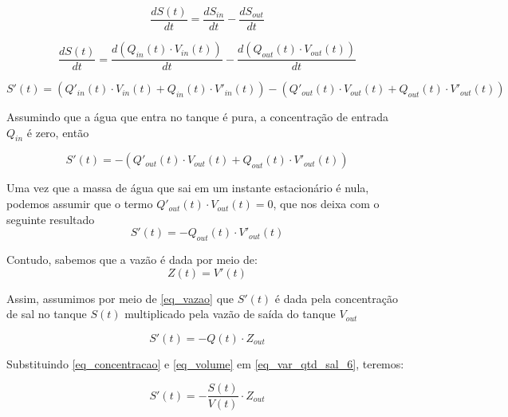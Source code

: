 \documentclass[11pt]{article}
\begin{document}
\begin{equation*}
    \label{eq_var_qtd_sal_2}
    \frac{dS(t)}{dt} = \frac{dS_{in}}{dt} - \frac{dS_{out}}{dt}
\end{equation*}

\begin{equation*}
    \label{eq_var_qtd_sal_3}
    \frac{dS(t)}{dt} = \frac{d(Q_{in}(t) \cdot V_{in}(t))}{dt} - \frac{d(Q_{out}(t) \cdot V_{out}(t))}{dt}
\end{equation*}

\begin{equation*}
    \label{eq_var_qtd_sal_4}
    S'(t) = (Q'_{in}(t) \cdot V_{in}(t) + Q_{in}(t) \cdot V'_{in}(t)) - (Q'_{out}(t) \cdot V_{out}(t) + Q_{out}(t) \cdot V'_{out}(t))
\end{equation*}

Assumindo que a água que entra no tanque é pura, a concentração de
entrada \(Q_{in}\) é zero, então

\begin{equation*}
    \label{eq_var_qtd_sal_5}
    S'(t) = - (Q'_{out}(t) \cdot V_{out}(t) + Q_{out}(t) \cdot V'_{out}(t))
\end{equation*}

Uma vez que a massa de água que sai em um instante estacionário é nula,
podemos assumir que o termo \(Q'_{out}(t) \cdot V_{out}(t) = 0\), que
nos deixa com o seguinte resultado \begin{equation*}
    S'(t) = - Q_{out}(t) \cdot V'_{out}(t)
\end{equation*}

Contudo, sabemos que a vazão é dada por meio de: \begin{equation}
    \label{eq_vazao}
    Z(t) = V'(t)
\end{equation}

Assim, assumimos por meio de \eqref{eq_vazao} que \(S'(t)\) é dada pela
concentração de sal no tanque \(S(t)\) multiplicado pela vazão de saída
do tanque \(V_{out}\)

\begin{equation}
    \label{eq_var_qtd_sal_6}
    S'(t) = - Q(t) \cdot Z_{out}
\end{equation}

Substituindo \eqref{eq_concentracao} e \eqref{eq_volume} em
\eqref{eq_var_qtd_sal_6}, teremos:

\begin{equation}
    \label{eq_var_qtd_sal_7}
    S'(t) = - \frac{S(t)}{V(t)} \cdot Z_{out}
\end{equation}
\end{document}
